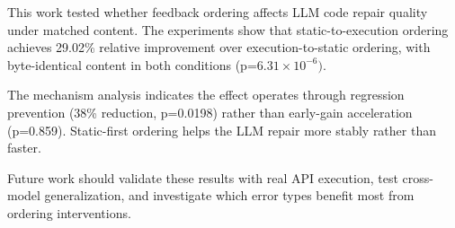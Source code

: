 
This work tested whether feedback ordering affects LLM code repair quality under matched content. The experiments show that static-to-execution ordering achieves 29.02\% relative improvement over execution-to-static ordering, with byte-identical content in both conditions (p=6.$31\times 10^{-6})$.

The mechanism analysis indicates the effect operates through regression prevention (38\% reduction, p=0.0198) rather than early-gain acceleration (p=0.859). Static-first ordering helps the LLM repair more stably rather than faster.

Future work should validate these results with real API execution, test cross-model generalization, and investigate which error types benefit most from ordering interventions.

